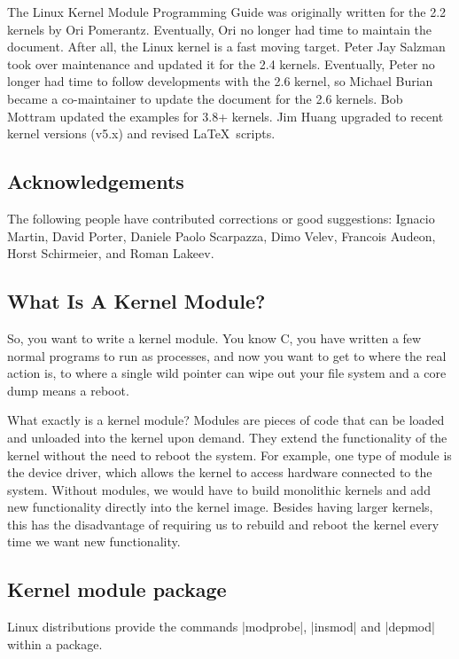 \documentclass[10pt, oneside]{book}
\begin{document}
The Linux Kernel Module Programming Guide was originally written for the 2.2 kernels by Ori Pomerantz.
Eventually, Ori no longer had time to maintain the document.
After all, the Linux kernel is a fast moving target.
Peter Jay Salzman took over maintenance and updated it for the 2.4 kernels.
Eventually, Peter no longer had time to follow developments with the 2.6 kernel, so Michael Burian became a co-maintainer to update the document for the 2.6 kernels.
Bob Mottram updated the examples for 3.8+ kernels.
Jim Huang upgraded to recent kernel versions (v5.x) and revised \LaTeX\ scripts.

\subsection{Acknowledgements}
\label{sec:acknowledgements}

The following people have contributed corrections or good suggestions: Ignacio Martin, David Porter, Daniele Paolo Scarpazza, Dimo Velev, Francois Audeon, Horst Schirmeier, and Roman Lakeev.

\subsection{What Is A Kernel Module?}
\label{sec:kernelmod}

So, you want to write a kernel module.
You know C, you have written a few normal programs to run as processes, and now you want to get to where the real action is, to where a single wild pointer can wipe out your file system and a core dump means a reboot.

What exactly is a kernel module?
Modules are pieces of code that can be loaded and unloaded into the kernel upon demand.
They extend the functionality of the kernel without the need to reboot the system.
For example, one type of module is the device driver, which allows the kernel to access hardware connected to the system.
Without modules, we would have to build monolithic kernels and add new functionality directly into the kernel image.
Besides having larger kernels, this has the disadvantage of requiring us to rebuild and reboot the kernel every time we want new functionality.

\subsection{Kernel module package}
\label{sec:packages}

Linux distributions provide the commands \sh|modprobe|, \sh|insmod| and \sh|depmod| within a package.
\end{document}
